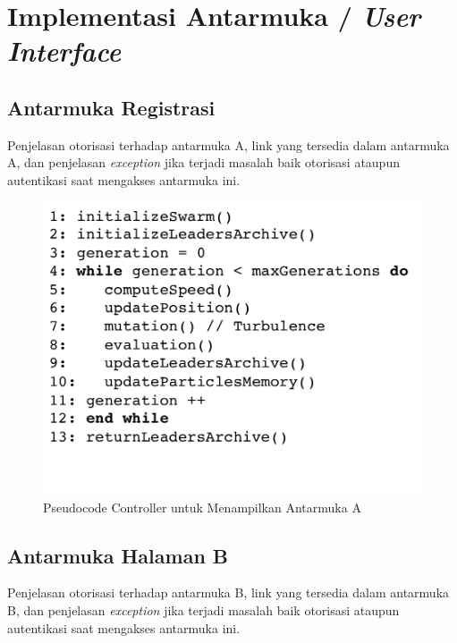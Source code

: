   
\section{Implementasi Antarmuka / \textit{User Interface}}
	
    \subsection{Antarmuka Registrasi}
    
    Penjelasan otorisasi terhadap antarmuka A, link yang tersedia dalam antarmuka A, dan penjelasan \textit{exception} jika terjadi masalah baik otorisasi ataupun autentikasi saat mengakses antarmuka ini.
  
      \begin{figure}[H]
        \centering
        \includegraphics[width=\linewidth]{images/bab4/smpso_code.png}
        \caption{ Pseudocode Controller untuk Menampilkan Antarmuka A }
        \label{pdm}
      \end{figure}
      
    \subsection{Antarmuka Halaman B}
    Penjelasan otorisasi terhadap antarmuka B, link yang tersedia dalam antarmuka B, dan penjelasan \textit{exception} jika terjadi masalah baik otorisasi ataupun autentikasi saat mengakses antarmuka ini.
  
